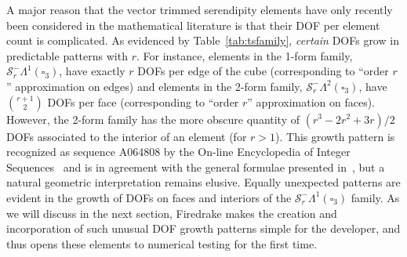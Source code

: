 \documentclass[format=acmsmall,screen,timestamp=false,a4paper]{acmart}
\DeclareMathOperator{\Div}{div}
\DeclareMathOperator{\curl}{curl}
\newcommand\akg[1]{\textbf{\textcolor[rgb]{.5,0,1}{[Andrew: #1]}}}
\newcommand{\calS}{\mathcal{S}}
\newcommand{\hcurl}{\ensuremath{{H}(\curl)}\xspace}
\newcommand{\hdiv}{\ensuremath{{H}(\Div)}\xspace}
\begin{document}
	
	A major reason that the vector trimmed serendipity elements have only recently been considered in the mathematical literature is that their DOF per element count is complicated.
	As evidenced by Table~\ref{tab:tsfamily}, \textit{certain} DOFs grow in predictable patterns with $r$.
	For instance, elements in the 1-form family, $\calS_r^-\Lambda^1(\square_3)$, have exactly $r$ DOFs per edge of the cube (corresponding to ``order $r$'' approximation on edges) and elements in the 2-form family, $\calS_r^-\Lambda^2(\square_3)$, have ${\displaystyle {r+1}\choose 2}$ DOFs per face (corresponding to ``order $r$'' approximation on faces).
	However, the 2-form family has the more obscure quantity of $(r^3 - 2r^2 + 3r)/2$ DOFs associated to the interior of an element (for $r>1$).
	This growth pattern is recognized as sequence A064808 by the On-line Encyclopedia of Integer Sequences~\cite{OEIS} and is in agreement with the general formulae presented in~\cite{gillette2019trimmed}, but a natural geometric interpretation remains elusive.
	Equally unexpected patterns are evident in the growth of DOFs on faces and interiors of the $\calS_r^-\Lambda^1(\square_3)$ family.
	As we will discuss in the next section, Firedrake makes the creation and incorporation of such unusual DOF growth patterns simple for the developer, and thus opens these elements to numerical testing for the first time.
	
%	
%
%	
%  
%	
%
%
%  
%  
  
\end{document}
